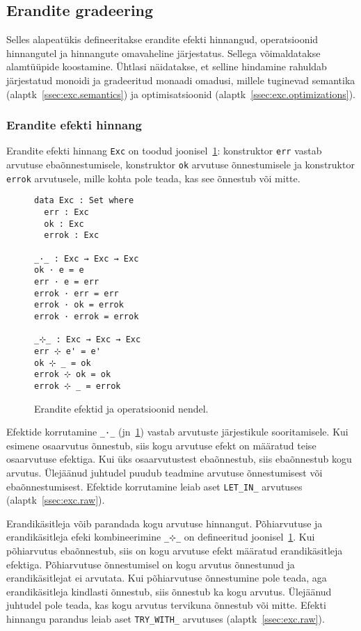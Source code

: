 \documentclass[a4paper,12pt]{article}
\begin{document}
\subsection{Erandite gradeering}\label{ssec:exc.grading}

Selles alapeatükis defineeritakse erandite efekti hinnangud, operatsioonid hinnangutel ja hinnangute omavaheline järjestatus.
Sellega võimaldatakse alamtüüpide koostamine.
Ühtlasi näidatakse, et selline hindamine rahuldab järjestatud monoidi ja gradeeritud monaadi omadusi,
millele tuginevad semantika (alaptk~\ref{ssec:exc.semantics}) ja optimisatsioonid (alaptk~\ref{ssec:exc.optimizations}). 

\subsubsection{Erandite efekti hinnang}\label{sssec:exc.exc}

Erandite efekti hinnang {\tt Exc} on toodud joonisel~\ref{fig:exc.exc}:
konstruktor {\tt err} vastab arvutuse ebaõnnestumisele,
konstruktor {\tt ok} arvutuse õnnestumisele ja konstruktor {\tt errok} arvutusele,
mille kohta pole teada, kas see õnnestub või mitte.

\begin{figure}
  \begin{BVerbatim}
data Exc : Set where
  err : Exc
  ok : Exc
  errok : Exc

_·_ : Exc → Exc → Exc
ok · e = e
err · e = err
errok · err = err
errok · ok = errok
errok · errok = errok

_⊹_ : Exc → Exc → Exc
err ⊹ e' = e'
ok ⊹ _ = ok
errok ⊹ ok = ok
errok ⊹ _ = errok
  \end{BVerbatim}
  \caption{Erandite efektid ja operatsioonid nendel.}
  \label{fig:exc.exc}
\end{figure}

Efektide korrutamine {\tt _·_} (jn~\ref{fig:exc.exc}) vastab arvutuste järjestikule sooritamisele.
Kui esimene osaarvutus õnnestub, siis kogu arvutuse efekt on määratud teise osaarvutuse efektiga.
Kui üks osaarvutustest ebaõnnestub, siis ebaõnnestub kogu arvutus.
Ülejäänud juhtudel puudub teadmine arvutuse õnnestumisest või ebaõnnestumisest.
Efektide korrutamine leiab aset {\tt LET_IN_} arvutuses (alaptk~\ref{ssec:exc.raw}).

Erandikäsitleja võib parandada kogu arvutuse hinnangut.
Põhiarvutuse ja erandikäsitleja efeki kombineerimine {\tt _⊹_} on defineeritud joonisel~\ref{fig:exc.exc}.
Kui põhiarvutus ebaõnnestub, siis on kogu arvutuse efekt määratud erandikäsitleja efektiga.
Põhiarvutuse õnnestumisel on kogu arvutus õnnestunud ja erandikäsitlejat ei arvutata.
Kui põhiarvutuse õnnestumine pole teada, aga erandikäsitleja kindlasti õnnestub, siis õnnestub ka kogu arvutus.
Ülejäänud juhtudel pole teada, kas kogu arvutus tervikuna õnnestub või mitte.
Efekti hinnangu parandus leiab aset {\tt TRY_WITH_} arvutuses (alaptk~\ref{ssec:exc.raw}).
\end{document}
